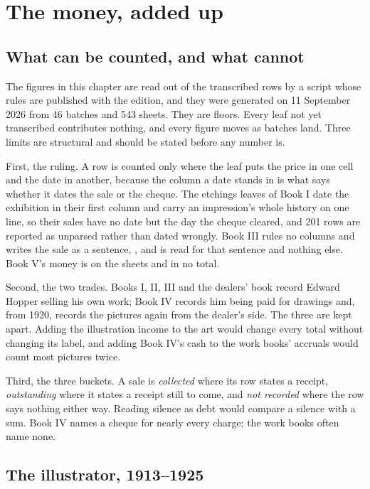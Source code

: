 \chapter{The money, added up}

\section{What can be counted, and what cannot}

The figures in this chapter are read out of the transcribed rows by a script whose rules are published with the edition, and they were generated on 11 September 2026 from 46 batches and 543 sheets. They are floors. Every leaf not yet transcribed contributes nothing, and every figure moves as batches land. Three limits are structural and should be stated before any number is.

First, the ruling. A row is counted only where the leaf puts the price in one cell and the date in another, because the column a date stands in is what says whether it dates the sale or the cheque. The etchings leaves of Book I date the exhibition in their first column and carry an impression's whole history on one line, so their sales have no date but the day the cheque cleared, and 201 rows are reported as unparsed rather than dated wrongly. Book III rules no columns and writes the sale as a sentence, , and is read for that sentence and nothing else. Book V's money is on the sheets and in no total.

Second, the two trades. Books I, II, III and the dealers' book record Edward Hopper selling his own work; Book IV records him being paid for drawings and, from 1920, records the pictures again from the dealer's side. The three are kept apart. Adding the illustration income to the art would change every total without changing its label, and adding Book IV's cash to the work books' accruals would count most pictures twice.

Third, the three buckets. A sale is \emph{collected} where its row states a receipt, \emph{outstanding} where it states a receipt still to come, and \emph{not recorded} where the row says nothing either way. Reading silence as debt would compare a silence with a sum. Book IV names a cheque for nearly every charge; the work books often name none.

\section{The illustrator, 1913--1925}

